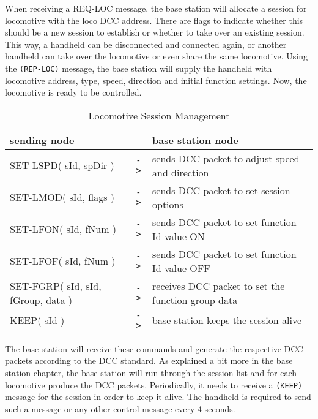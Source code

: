 When receiving a REQ-LOC message, the base station will allocate a session for locomotive with the loco DCC address. There are flags to indicate whether this should be a new session to establish or whether to take over an existing session. This way, a handheld can be disconnected and connected again, or another handheld can take over the locomotive or even share the same locomotive. Using the \texttt{(REP-LOC)} message, the base station will supply the handheld with locomotive address, type, speed, direction and initial function settings. Now, the locomotive is ready to be controlled.

\begin{table}[ht!]
    \begin{center}
        \caption{Locomotive Session Management}
        \begin{tabular}{|p{} c p{}|}
            \toprule
            \textbf{sending node} & & \textbf{ base station node } \\
            \midrule
            SET-LSPD( sId, spDir ) & \texttt{->} & sends DCC packet to adjust speed and direction  \\
            SET-LMOD( sId, flags ) & \texttt{->} & sends DCC packet to set session options   \\
            SET-LFON( sId, fNum ) & \texttt{->} & sends DCC packet to set function Id value ON  \\
            SET-LFOF( sId, fNum ) & \texttt{->} & sends DCC packet to set function Id value OFF  \\
            SET-FGRP( sId, sId, fGroup, data ) & \texttt{->} & receives DCC packet to set the function group data  \\
            KEEP( sId ) & \texttt{->} & base station keeps the session alive  \\
            \bottomrule
        \end{tabular}
    \end{center}
\end{table}

The base station will receive these commands and generate the respective DCC packets according to the DCC standard. As explained a bit more in the base station chapter, the base station will run through the session list and for each locomotive produce the DCC packets. Periodically, it needs to receive a \texttt{(KEEP)} message for the session in order to keep it alive. The handheld is required to send such a message or any other control message every 4 seconds.

